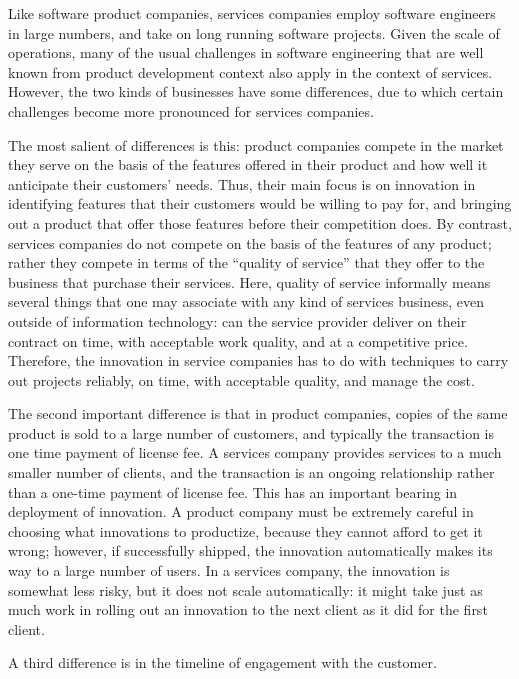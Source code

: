 Like software product companies, services companies employ software engineers in large numbers, and take on long running software projects. Given the scale of operations, many of the usual challenges in software engineering that are well known from product development context also apply in the context of services.  However, the two kinds of businesses have some differences, due to which certain challenges become more pronounced for services companies. 

The most salient of differences is this: product companies compete in the market they serve on the basis of the features offered in their product and how well it anticipate their customers' needs. Thus, their main focus is on innovation in identifying features that their customers would be willing to pay for, and bringing out a product that offer those features before their competition does. By contrast, services companies do not compete on the basis of the features of any product; rather they compete in terms of the ``quality of service'' that they offer to the business that purchase their services. Here, quality of service informally means several things that one may associate with any kind of services business, even outside of information technology: can the service provider deliver on their contract on time, with acceptable work quality, and at a competitive price.  Therefore, the innovation in service companies has to do with techniques to carry out projects reliably, on time, with acceptable quality, and manage the cost.

The second important difference is that in product companies, copies of the same product is sold to a large number of customers, and typically the transaction is one time payment of license fee.  A services company provides services to a much smaller number of clients, and the transaction is an ongoing relationship rather than a one-time payment of license fee. This has an important bearing in deployment of innovation.  A product company must be extremely careful in choosing what innovations to productize, because they cannot afford to get it wrong; however, if successfully shipped, the innovation automatically makes its way to a large number of users.  In a services company, the innovation is somewhat less risky, but it does not scale automatically: it might take just as much work in rolling out an innovation to the next client as it did for the first client.

A third difference is in the timeline of engagement with the customer.




\label{sec:intro}
